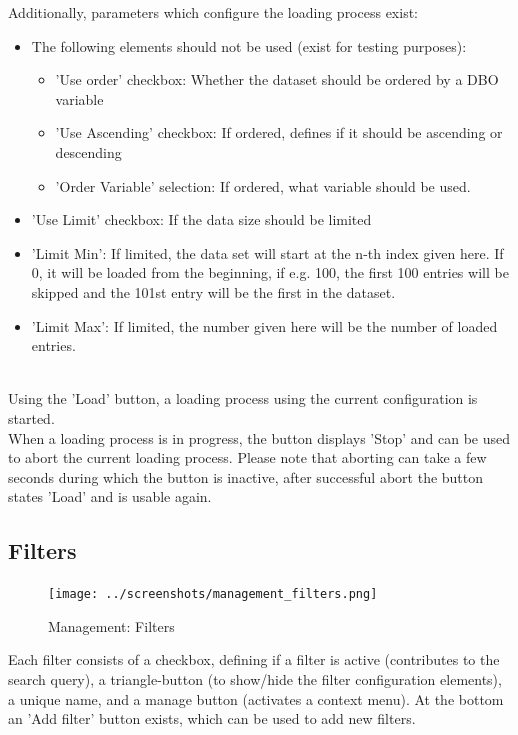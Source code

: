 Additionally, parameters which configure the loading process exist:

\begin{itemize}
\item The following elements should not be used (exist for testing purposes):
\begin{itemize}
 \item 'Use order' checkbox: Whether the dataset should be ordered by a DBO variable
 \item 'Use Ascending' checkbox: If ordered, defines if it should be ascending or descending
 \item 'Order Variable' selection: If ordered, what variable should be used.
\end{itemize}
 \item 'Use Limit' checkbox: If the data size should be limited
 \item 'Limit Min': If limited, the data set will start at the n-th index given here. If 0, it will be loaded from the beginning, if e.g. 100, the first 100 entries will be skipped and the 101st entry will be the first in the dataset.
\item 'Limit Max': If limited, the number given here will be the number of loaded entries.
\end{itemize}
\ \\

Using the 'Load' button, a loading process using the current configuration is started.  \\

When a loading process is in progress, the button displays 'Stop' and can be used to abort the current loading process. Please note that aborting can take a few seconds during which the button is inactive, after successful abort the button states 'Load' and is usable again.

\subsection{Filters}

\begin{figure}[H]
  \center
    \texttt{[image: ../screenshots/management\_filters.png]}
  \caption{Management: Filters}
\end{figure}

Each filter consists of a checkbox, defining if a filter is active (contributes to the search query), a triangle-button (to show/hide the filter configuration elements), a unique name, and a manage button (activates a context menu). At the bottom an 'Add filter' button exists, which can be used to add new filters. \\

